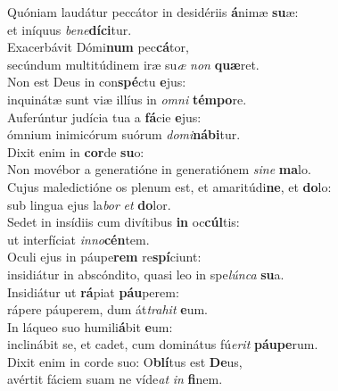 \evenverse Quóniam laudátur peccátor in desidériis \textbf{á}nimæ \textbf{su}æ:~\*\\
\evenverse et iníquus \textit{be}\textit{ne}\textbf{dí}\textbf{ci}tur.\\
\oddverse Exacerbávit Dómi\textbf{num} pec\textbf{cá}tor,~\*\\
\oddverse secúndum multitúdinem iræ su\textit{æ} \textit{non} \textbf{quæ}ret.\\
\evenverse Non est Deus in con\textbf{spé}ctu \textbf{e}jus:~\*\\
\evenverse inquinátæ sunt viæ illíus in \textit{om}\textit{ni} \textbf{tém}\textbf{po}re.\\
\oddverse Auferúntur judícia tua a \textbf{fá}cie \textbf{e}jus:~\*\\
\oddverse ómnium inimicórum suórum \textit{do}\textit{mi}\textbf{ná}\textbf{bi}tur.\\
\evenverse Dixit enim in \textbf{cor}de \textbf{su}o:~\*\\
\evenverse Non movébor a generatióne in generatiónem \textit{si}\textit{ne} \textbf{ma}lo.\\
\oddverse Cujus maledictióne os plenum est, et amaritúdi\textbf{ne}, et \textbf{do}lo:~\*\\
\oddverse sub lingua ejus la\textit{bor} \textit{et} \textbf{do}lor.\\
\evenverse Sedet in insídiis cum divítibus \textbf{in} oc\textbf{cúl}tis:~\*\\
\evenverse ut interfíciat \textit{in}\textit{no}\textbf{cén}tem.\\
\oddverse Oculi ejus in páupe\textbf{rem} re\textbf{spí}ciunt:~\*\\
\oddverse insidiátur in abscóndito, quasi leo in spe\textit{lún}\textit{ca} \textbf{su}a.\\
\evenverse Insidiátur ut \textbf{rá}piat \textbf{páu}perem:~\*\\
\evenverse rápere páuperem, dum át\textit{tra}\textit{hit} \textbf{e}um.\\
\oddverse In láqueo suo humili\textbf{á}bit \textbf{e}um:~\*\\
\oddverse inclinábit se, et cadet, cum dominátus fú\textit{e}\textit{rit} \textbf{páu}\textbf{pe}rum.\\
\evenverse Dixit enim in corde suo: O\textbf{blí}tus est \textbf{De}us,~\*\\
\evenverse avértit fáciem suam ne víde\textit{at} \textit{in} \textbf{fi}nem.\\
